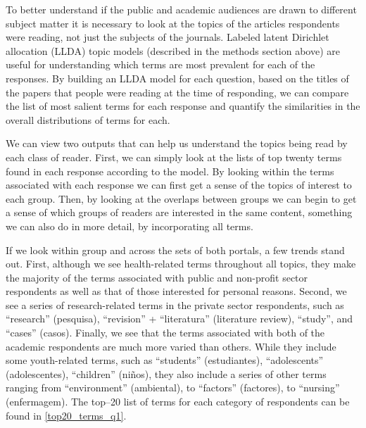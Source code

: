 To better understand if the public and academic audiences are drawn to different subject matter it is necessary to look at the topics of the articles respondents were reading, not just the subjects of the journals. Labeled latent Dirichlet allocation (LLDA) topic models (described in the methods section above) are useful for understanding which terms are most prevalent for each of the responses. By building an LLDA model for each question, based on the titles of the papers that people were reading at the time of responding, we can compare the list of most salient terms for each response and quantify the similarities in the overall distributions of terms for each.

We can view two outputs that can help us understand the topics being read by each class of reader. First, we can simply look at the lists of top twenty terms found in each response according to the model. By looking within the terms associated with each response we can first get a sense of the topics of interest to each group. Then, by looking at the overlaps between groups we can begin to get a sense of which groups of readers are interested in the same content, something we can also do in more detail, by incorporating all terms.

If we look within group and across the sets of both portals, a few trends stand out. First, although we see health-related terms throughout all topics, they make the majority of the terms associated with public and non-profit sector respondents as well as that of those interested for personal reasons. Second, we see a series of research-related terms in the private sector respondents, such as ``research'' (pesquisa), ``revision'' + ``literatura'' (literature review), ``study'', and ``cases'' (casos). Finally, we see that the terms associated with both of the academic respondents are much more varied than others. While they include some youth-related terms, such as ``students'' (estudiantes), ``adolescents'' (adolescentes), ``children'' (niños), they also include a series of other terms ranging from ``environment'' (ambiental), to ``factors'' (factores), to ``nursing'' (enfermagem). The top--20 list of terms for each category of respondents can be found in \autoref{top20_terms_q1}.




